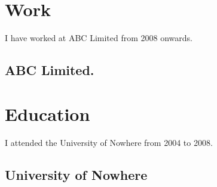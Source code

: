 \documentclass{sobCV}[2015/09/08]
\begin{document}

   \section{Work}
   I have worked at ABC Limited from 2008 onwards.

   \subsection{ABC Limited.}

   \section{Education}
   I attended the University of Nowhere from 2004 to 2008.

   \subsection{University of Nowhere}
\end{document}
